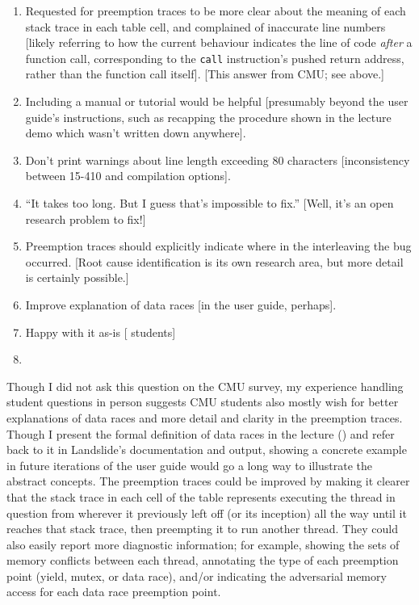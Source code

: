 \begin{enumerate}
	\item Requested for preemption traces to be more clear about the meaning of each stack trace in each table cell,
		and complained of inaccurate line numbers
		[likely referring to how the current behaviour indicates the line of code {\em after} a function call,
		corresponding to the {\tt call} instruction's pushed return address,
		rather than the function call itself]. [This answer from CMU; see above.]
	\item Including a manual or tutorial would be helpful [presumably beyond the user guide's instructions, such as recapping the procedure shown in the lecture demo which wasn't written down anywhere].
	\item Don't print warnings about line length exceeding 80 characters [inconsistency between 15-410 and \psuos compilation options].
	\item ``It takes too long. But I guess that's impossible to fix.'' [Well, it's an open research problem to fix!]
	\item Preemption traces should explicitly indicate where in the interleaving the bug occurred.
		[Root cause identification is its own research area, but more detail is certainly possible.]
	\item Improve explanation of data races [in the user guide, perhaps].
	\item Happy with it as-is [ students]
	\item [\revisionminor{Seven non-respondents}]
\end{enumerate}

Though I did not ask this question on the CMU survey,
my experience handling student questions in person
suggests CMU students
also mostly wish for
better explanations of data races and
more detail and clarity in the preemption traces.
Though I present the formal definition of data races in the lecture
(\sect{\ref{sec:education-pebbles-recruiting}})
and refer back to it in Landslide's documentation and output,
showing a concrete example
in future iterations of the user guide
would go a long way to illustrate the abstract concepts.
The preemption traces could be improved by making it clearer that the stack trace in each cell of the table
represents executing the thread in question from wherever it previously left off (or its inception)
all the way until it reaches that stack trace, then preempting it to run another thread.
They could also easily report more diagnostic information;
for example, showing the sets of memory conflicts between each thread,
annotating the type of each preemption point (yield, mutex, or data race),
and/or indicating the adversarial memory access for each data race preemption point.

